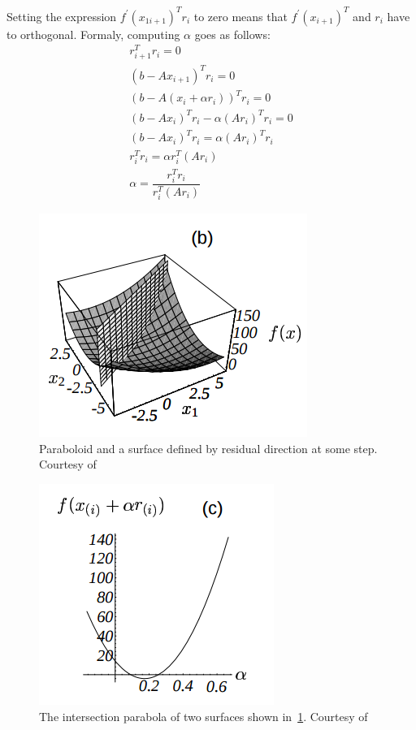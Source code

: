 \documentclass[en]{minipw} %
\begin{document}
Setting the expression $f^{'}(x_{1i+1})^{T} r_i$ to zero means that $f^{'}(x_{i+1})^{T}$ and  $r_i$ have to orthogonal.
Formaly, computing $\alpha$ goes as follows:
\begin{equation}
\begin{aligned}
r^{T}_{i+1}r_{i} = 0
\\
(b - Ax_{i+1})^{T}r_{i} = 0
\\
(b - A(x_{i} + \alpha r_{i}))^{T}r_{i} = 0
\\
(b - Ax_{i})^{T}r_{i} - \alpha (Ar_{i})^{T}r_{i}= 0
\\
(b - Ax_{i})^{T}r_{i} = \alpha (Ar_{i})^{T}r_{i}
\\
r_{i}^{T}r_{i} = \alpha r_{i}^{T} (Ar_{i})
\\
\alpha = \dfrac{r_{i}^{T}r_{i}}{r_{i}^{T} (Ar_{i})}
\end{aligned}
\end{equation}

\begin{figure}[h!]
\centering
\includegraphics[scale=0.8]{pictures/alpha1.png}
\caption[Logo MiNI]{Paraboloid and a surface defined by residual direction at some step. Courtesy of~\cite{cg}}
\label{fig:cg_alpha1}
\end{figure}

\begin{figure}[h!]
\centering
\includegraphics[scale=0.8]{pictures/alpha2.png}
\caption[Logo MiNI]{The intersection parabola of two surfaces shown in~\ref{fig:cg_alpha1}. Courtesy of~\cite{cg}}
\label{fig:cg_alpha2}
\end{figure}
\end{document}
